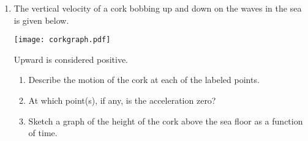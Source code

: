 \documentclass[11pt]{article}
\begin{document}
\begin{enumerate}
  \newpage

\item The vertical velocity of a cork bobbing up and down on the waves
  in the sea is given below.
  \begin{center}
    \texttt{[image: corkgraph.pdf]}
  \end{center}
  Upward is considered positive.
  \begin{enumerate}
  \item Describe the motion of the cork at each of the labeled points.
    \vfill
  \item At which point(s), if any, is the acceleration zero?
    \vfill
  \item Sketch a graph of the height of the cork above the sea floor
    as a function of time.
    \vfill
  \end{enumerate}

\end{enumerate}
\end{document}
